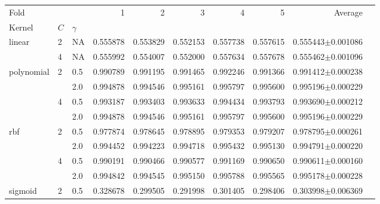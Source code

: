 \documentclass[nocrop]{bioinfo}
\begin{document}
\begin{supplementary}
\begin{table}[h]
	 {
	\centering
	\begin{tabular}{lllrrrrrrr}
		\toprule
Fold
		&   &     &              1 &              2 &              3 &              4 &              5 &        Average\\
		Kernel & $C$ & $\gamma$ &                &                &                &                &                &                &                \\
		\midrule
		\multirow{2}{*}{linear} & 2 & NA & \num{0.555878} & \num{0.553829} & \num{0.552153} & \num{0.557738} & \num{0.557615} & \num{0.555443}$\pm$\num{0.001086} \\
		& 4 & NA & \num{0.555992} & \num{0.554007} & \num{0.552000} & \num{0.557634} & \num{0.557678} & \num{0.555462}$\pm$\num{0.001096} \\
		\cline{1-10}
		\multirow{4}{*}{polynomial} & \multirow{2}{*}{2} & 0.5 & \num{0.990789} & \num{0.991195} & \num{0.991465} & \num{0.992246} & \num{0.991366} & \num{0.991412}$\pm$\num{0.000238} \\
		&   & 2.0 & \num{0.994878} & \num{0.994546} & \num{0.995161} & \num{0.995797} & \num{0.995600} & \num{0.995196}$\pm$\num{0.000229} \\
		\cline{2-10}
		& \multirow{2}{*}{4} & 0.5 & \num{0.993187} & \num{0.993403} & \num{0.993633} & \num{0.994434} & \num{0.993793} & \num{0.993690}$\pm$\num{0.000212} \\
		&   & 2.0 & \num{0.994878} & \num{0.994546} & \num{0.995161} & \num{0.995797} & \num{0.995600} & \num{0.995196}$\pm$\num{0.000229} \\
		\cline{1-10}
		\cline{2-10}
		\multirow{4}{*}{rbf} & \multirow{2}{*}{2} & 0.5 & \num{0.977874} & \num{0.978645} & \num{0.978895} & \num{0.979353} & \num{0.979207} & \num{0.978795}$\pm$\num{0.000261} \\
		&   & 2.0 & \num{0.994452} & \num{0.994223} & \num{0.994718} & \num{0.995432} & \num{0.995130} & \num{0.994791}$\pm$\num{0.000220} \\
		\cline{2-10}
		& \multirow{2}{*}{4} & 0.5 & \num{0.990191} & \num{0.990466} & \num{0.990577} & \num{0.991169} & \num{0.990650} & \num{0.990611}$\pm$\num{0.000160} \\
		&   & 2.0 & \num{0.994842} & \num{0.994545} & \num{0.995150} & \num{0.995788} & \num{0.995565} & \num{0.995178}$\pm$\num{0.000228} \\
		\cline{1-10}
		\cline{2-10}
		\multirow{4}{*}{sigmoid} & \multirow{2}{*}{2} & 0.5 & \num{0.328678} & \num{0.299505} & \num{0.291998} & \num{0.301405} & \num{0.298406} & \num{0.303998}$\pm$\num{0.006369} \\

\end{tabular}}
\end{table}
\end{supplementary}
\end{document}
